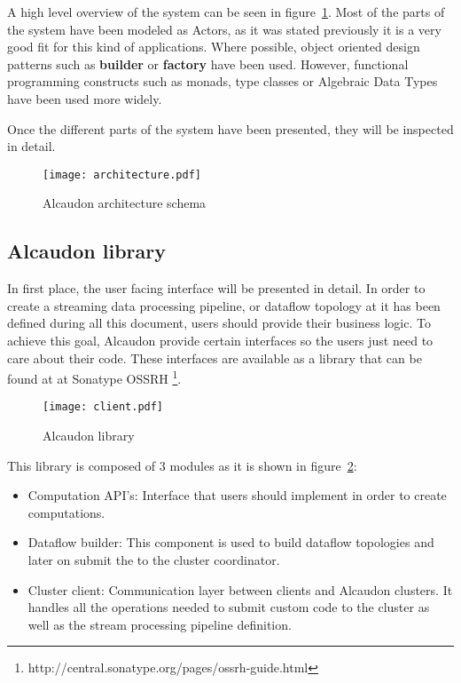 A high level overview of the system can be seen in
figure~\ref{fig:architecture}. Most of the parts of the system have been modeled
as Actors, as it was stated previously it is a very good fit for this kind of
applications. Where possible, object oriented design patterns\cite{gof} such as
\textbf{builder} or \textbf{factory} have been used. However, functional
programming constructs such as monads\cite{monads}, type
classes\cite{typeclasses} or Algebraic Data Types have been used more widely.

Once the different parts of the system have been presented, they will be
inspected in detail.

\begin{figure}
  \centering
  \texttt{[image: architecture.pdf]}
  \caption{Alcaudon architecture schema}
  \label{fig:architecture}
\end{figure}

\subsection{Alcaudon library}

In first place, the user facing interface will be presented in detail. In order
to create a streaming data processing pipeline, or dataflow topology at it has
been defined during all this document, users should provide their business
logic. To achieve this goal, Alcaudon provide certain interfaces so the users
just need to care about their code. These interfaces are available as a library
that can be found at at Sonatype OSSRH \footnote{http://central.sonatype.org/pages/ossrh-guide.html}.

\begin{figure}
  \centering
  \texttt{[image: client.pdf]}
  \caption{Alcaudon library}
  \label{fig:library}
\end{figure}

This library is composed of 3 modules as it is shown in figure~\ref{fig:library}:

\begin{itemize}
\item Computation API's: Interface that users should implement in order to
  create computations.
\item Dataflow builder: This component is used to build dataflow topologies and
  later on submit the to the cluster coordinator.
\item Cluster client: Communication layer between clients and Alcaudon clusters.
  It handles all the operations needed to submit custom code to the cluster as well
  as the stream processing pipeline definition.
\end{itemize}

